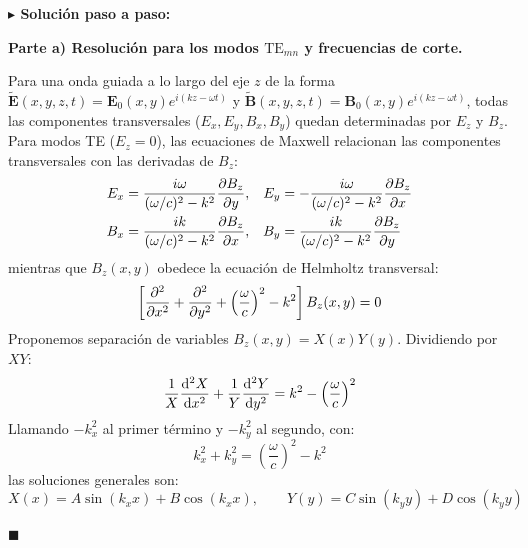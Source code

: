 \documentclass[11pt,a4paper]{book}
\newenvironment{solucion}{%
    \par\medskip\noindent\textbf{\color{blue!65!black}\Large $\blacktriangleright$ Solución paso a paso:}\par\medskip
}{%
    \hfill$\blacksquare$\par\bigskip
}
\newcommand{\Evec}{\bm{E}}
\newcommand{\Bvec}{\bm{B}}
\begin{document}
\begin{solucion}
\textbf{Parte a) Resolución para los modos $\text{TE}_{mn}$ y frecuencias de corte.}

Para una onda guiada a lo largo del eje $z$ de la forma $\tilde{\Evec}(x,y,z,t) = \Evec_0(x,y)e^{i(kz-\omega t)}$ y $\tilde{\Bvec}(x,y,z,t) = \Bvec_0(x,y)e^{i(kz-\omega t)}$, todas las componentes transversales ($E_x, E_y, B_x, B_y$) quedan determinadas por $E_z$ y $B_z$. Para modos TE ($E_z = 0$), las ecuaciones de Maxwell relacionan las componentes transversales con las derivadas de $B_z$:
\begin{align}
    E_x &= \frac{i\omega}{(\omega/c)^2 - k^2}\pdv{B_z}{y}, & E_y &= -\frac{i\omega}{(\omega/c)^2 - k^2}\pdv{B_z}{x} \label{eq:te_trans_e} \\
    B_x &= \frac{ik}{(\omega/c)^2 - k^2}\pdv{B_z}{x}, & B_y &= \frac{ik}{(\omega/c)^2 - k^2}\pdv{B_z}{y}
\end{align}
mientras que $B_z(x,y)$ obedece la ecuación de Helmholtz transversal:
\begin{equation}
    \left[ \pdv[2]{}{x} + \pdv[2]{}{y} + \left(\frac{\omega}{c}\right)^2 - k^2 \right] B_z(x,y) = 0
\end{equation}
Proponemos separación de variables $B_z(x,y) = X(x)Y(y)$. Dividiendo por $XY$:
\begin{equation}
    \frac{1}{X}\dv[2]{X}{x} + \frac{1}{Y}\dv[2]{Y}{y} = k^2 - \left(\frac{\omega}{c}\right)^2
\end{equation}
Llamando $-k_x^2$ al primer término y $-k_y^2$ al segundo, con:
\begin{equation}
    k_x^2 + k_y^2 = \left(\frac{\omega}{c}\right)^2 - k^2 \label{eq:disp_guia}
\end{equation}
las soluciones generales son:
\begin{equation}
    X(x) = A\sin(k_x x) + B\cos(k_x x), \qquad Y(y) = C\sin(k_y y) + D\cos(k_y y)
\end{equation}


\end{solucion}
\end{document}
